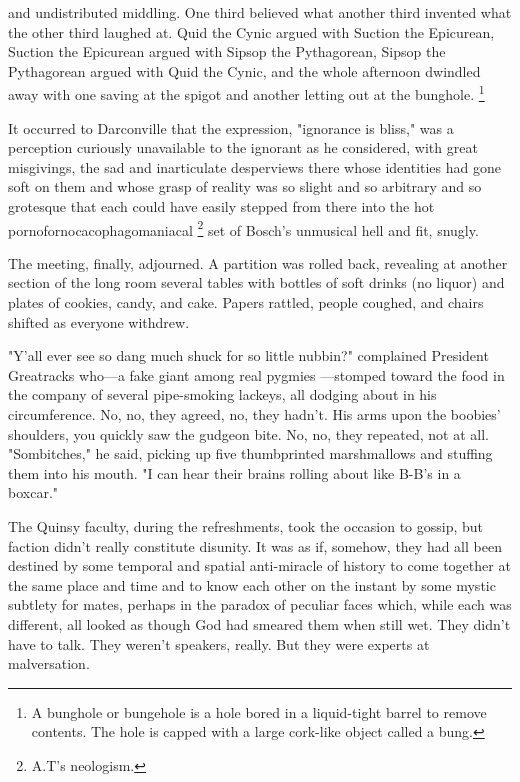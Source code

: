 and undistributed middling.
One third believed what another third invented what the other third laughed at.
Quid the Cynic argued with Suction the Epicurean, Suction the Epicurean argued
with Sipsop the Pythagorean, Sipsop the Pythagorean argued with Quid the Cynic,
and the whole afternoon dwindled away with one saving at the spigot 
and another letting out at the bunghole.
\footnote{A bunghole or bungehole is a hole bored in a liquid-tight barrel to remove contents. The hole is capped with a large cork-like object called a bung. }

  It occurred to Darconville that the expression, "ignorance is bliss," was a
perception curiously unavailable to the ignorant as he considered, with great
misgivings, the sad and inarticulate desperviews there whose identities had gone
soft on them and whose grasp of reality was so slight and so arbitrary and so
grotesque that each could have easily stepped from there into the hot
pornofornocacophagomaniacal 
\footnote{\textdbend A.T's neologism.}
set of Bosch's unmusical hell and fit, snugly.

  The meeting, finally, adjourned. A partition was rolled back, revealing at
another section of the long room several tables with bottles of soft drinks (no
liquor) and plates of cookies, candy, and cake. Papers rattled, people coughed,
and chairs shifted as everyone withdrew.

  "Y'all ever see so dang much shuck for so little nubbin?" complained President
Greatracks who---a fake giant among real pygmies ---stomped toward the food in the
company of several pipe-smoking lackeys, all dodging about in his circumference.
No, no, they agreed, no, they hadn't. His arms upon the boobies' shoulders, you
quickly saw the gudgeon bite. No, no, they repeated, not at all. "Sombitches,"
he said, picking up five thumbprinted marshmallows and stuffing them into his
mouth. "I can hear their brains rolling about like B-B's in a boxcar."

  The Quinsy faculty, during the refreshments, took the occasion to gossip, but
faction didn't really constitute disunity. It was as if, somehow, they had all
been destined by some temporal and spatial anti-miracle of history to come
together at the same place and time and to know each other on the instant by
some mystic subtlety for mates, perhaps in the paradox of peculiar faces which,
while each was different, all looked as though God had smeared them when still
wet. They didn't have to talk. They weren't speakers, really. But they were
experts at malversation.

